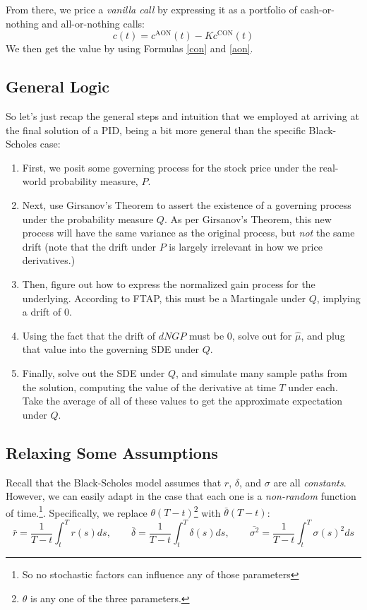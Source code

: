 \documentclass[12pt]{article}
\theoremstyle{plain}
\theoremstyle{definition}
\theoremstyle{remark}
\begin{document}
From there, we price a \emph{vanilla call} by expressing it as a
portfolio of cash-or-nothing and all-or-nothing calls:
   \[ c(t) = c^{\text{AON}}(t) - K  c^{\text{CON}}(t) \]
We then get the value by using Formulas \ref{con} and \ref{aon}.

\newpage


\subsection{General Logic}

So let's just recap the general steps and intuition that we employed
at arriving at the final solution of a PID, being a bit more general
than the specific Black-Scholes case:
\begin{enumerate}
   \item{First, we posit some governing process for the stock price
      under the real-world probability measure, $P$.}
   \item{Next, use Girsanov's Theorem to assert the existence of a
      governing process under the probability measure $Q$.  As per 
      Girsanov's Theorem, this new process
      will have the same variance as the
      original process, but \emph{not} the same drift (note that
      the drift under $P$ is largely irrelevant in how we price
      derivatives.)}
   \item{Then, figure out how to express the normalized gain process
      for the underlying. According to FTAP, 
      this must be a Martingale under $Q$, implying a drift of 0.}
   \item{Using the fact that the drift of $dNGP$ must be 0, solve
      out for $\hat{\mu}$, and plug that value into the governing SDE
      under $Q$.}
   \item{Finally, solve out the SDE under $Q$, and simulate many 
      sample paths from the solution, computing the value of 
      the derivative at time $T$ under each. Take the average of all of 
      these values to get the approximate expectation under $Q$.}
\end{enumerate}

\subsection{Relaxing Some Assumptions}

Recall that the Black-Scholes model assumes that $r$, $\delta$, and
$\sigma$ are all \emph{constants}. However, we can easily adapt in the
case that each one is a \emph{non-random} function of 
time.\footnote{So no stochastic factors can influence any of those 
parameters}. Specifically, we replace $\theta (T-t)$\footnote{$\theta$
is any one of the three parameters.} with $\bar{\theta}(T-t)$:
   \[ \bar{r} = \frac{1}{T-t} \int^T_t r(s) ds, \qquad
      \bar{\delta} = \frac{1}{T-t} \int^T_t \delta(s) ds, \qquad
      \bar{\sigma^2} = \frac{1}{T-t} \int^T_t \sigma(s)^2 ds \]
\end{document}

